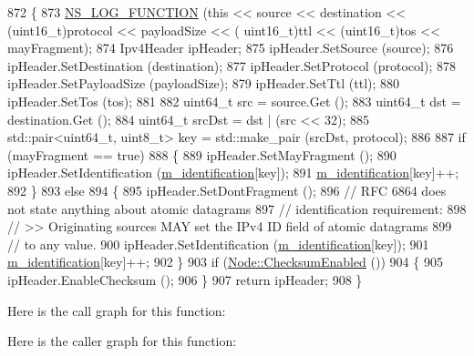 \begin{DoxyCode}
872 \{
873   \hyperlink{log-macros-disabled_8h_a90b90d5bad1f39cb1b64923ea94c0761}{NS\_LOG\_FUNCTION} (\textcolor{keyword}{this} << source << destination << (uint16\_t)protocol << payloadSize << (
      uint16\_t)ttl << (uint16\_t)tos << mayFragment);
874   Ipv4Header ipHeader;
875   ipHeader.SetSource (source);
876   ipHeader.SetDestination (destination);
877   ipHeader.SetProtocol (protocol);
878   ipHeader.SetPayloadSize (payloadSize);
879   ipHeader.SetTtl (ttl);
880   ipHeader.SetTos (tos);
881 
882   uint64\_t src = source.Get ();
883   uint64\_t dst = destination.Get ();
884   uint64\_t srcDst = dst | (src << 32);
885   std::pair<uint64\_t, uint8\_t> key = std::make\_pair (srcDst, protocol);
886 
887   \textcolor{keywordflow}{if} (mayFragment == \textcolor{keyword}{true})
888     \{
889       ipHeader.SetMayFragment ();
890       ipHeader.SetIdentification (\hyperlink{classns3_1_1Ipv4L3Protocol_a64746ae9a15d32cd8d0b4467d6b66949}{m\_identification}[key]);
891       \hyperlink{classns3_1_1Ipv4L3Protocol_a64746ae9a15d32cd8d0b4467d6b66949}{m\_identification}[key]++;
892     \}
893   \textcolor{keywordflow}{else}
894     \{
895       ipHeader.SetDontFragment ();
896       \textcolor{comment}{// RFC 6864 does not state anything about atomic datagrams}
897       \textcolor{comment}{// identification requirement:}
898       \textcolor{comment}{// >> Originating sources MAY set the IPv4 ID field of atomic datagrams}
899       \textcolor{comment}{//    to any value.}
900       ipHeader.SetIdentification (\hyperlink{classns3_1_1Ipv4L3Protocol_a64746ae9a15d32cd8d0b4467d6b66949}{m\_identification}[key]);
901       \hyperlink{classns3_1_1Ipv4L3Protocol_a64746ae9a15d32cd8d0b4467d6b66949}{m\_identification}[key]++;
902     \}
903   \textcolor{keywordflow}{if} (\hyperlink{classns3_1_1Node_a0515bfe9a3aeb6605d657ba855699815}{Node::ChecksumEnabled} ())
904     \{
905       ipHeader.EnableChecksum ();
906     \}
907   \textcolor{keywordflow}{return} ipHeader;
908 \}
\end{DoxyCode}


Here is the call graph for this function\+:




Here is the caller graph for this function\+:


